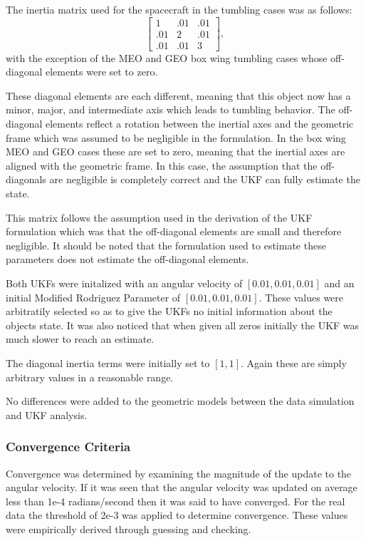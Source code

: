 The inertia matrix used for the spacecraft in the tumbling cases was as follows:
\begin{equation}\label{inertia_matrix}
\begin{bmatrix}
1 & .01 & .01 \\ .01 & 2 & .01 \\ .01 & .01 &3
\end{bmatrix},
\end{equation}
with the exception of the MEO and GEO box wing tumbling cases whose off-diagonal elements were set to zero.

These diagonal elements are each different, meaning that this object now has a minor, major, and intermediate axis which leads to tumbling behavior. The off-diagonal elements reflect a rotation between the inertial axes and the geometric frame which was assumed to be negligible in the formulation. In the box wing MEO and GEO cases these are set to zero, meaning that the inertial axes are aligned with the geometric frame. In this case, the assumption that the off-diagonals are negligible is completely correct and the UKF can fully estimate the state.

This matrix follows the assumption used in the derivation of the UKF formulation which was that the off-diagonal elements are small and therefore negligible. It should be noted that the formulation used to estimate these parameters does not estimate the off-diagonal elements.

Both UKFs were initalized with an angular velocity of $[0.01, 0.01, 0.01]$ and an initial Modified Rodriguez Parameter of $[0.01, 0.01, 0.01]$. These values were arbitratily selected so as to give the UKFs no initial information about the objects state. It was also noticed that when given all zeros initially the UKF was much slower to reach an estimate.

The diagonal inertia terms were initially set to $[1, 1]$. Again these are simply arbitrary values in a reasonable range.

No differences were added to the geometric models between the data simulation and UKF analysis.

\subsubsection{Convergence Criteria}

Convergence was determined by examining the magnitude of the update to the angular velocity. If it was seen that the angular velocity was updated on average less than 1e-4 radians/second then it was said to have converged. For the real data the threshold of 2e-3 was applied to determine convergence. These values were empirically derived through guessing and checking.

